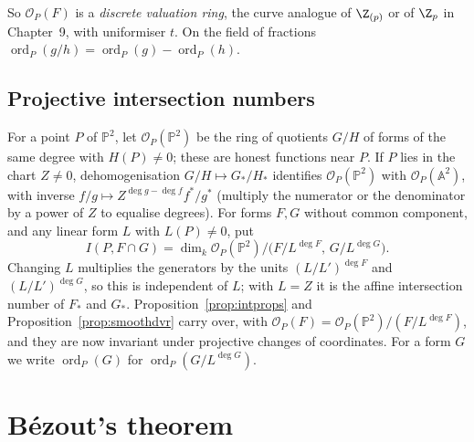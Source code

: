 So $\mathcal O_P(F)$ is a \emph{discrete valuation ring}, the curve analogue of $\Z_{(p)}$ or of $\Z_p$ in Chapter~9, with uniformiser $t$.
On the field of fractions $\operatorname{ord}_P(g/h)=\operatorname{ord}_P(g)-\operatorname{ord}_P(h)$.

\subsection*{Projective intersection numbers}

For a point $P$ of $\mathbb P^2$, let $\mathcal O_P(\mathbb P^2)$ be the ring of quotients $G/H$ of forms of the same degree with $H(P)\ne0$; these are
honest functions near $P$. If $P$ lies in the chart $Z\ne0$, dehomogenisation $G/H\mapsto G_*/H_*$ identifies $\mathcal O_P(\mathbb P^2)$ with
$\mathcal O_P(\mathbb A^2)$, with inverse $f/g\mapsto Z^{\deg g-\deg f}f^*/g^*$ (multiply the numerator or the denominator by a power of $Z$ to equalise
degrees). For forms $F,G$ without common component, and any linear form $L$ with $L(P)\ne0$, put
\[
I(P,F\cap G)=\dim_k\mathcal O_P(\mathbb P^2)\big/\bigl(F/L^{\deg F},\,G/L^{\deg G}\bigr).
\]
Changing $L$ multiplies the generators by the units $(L/L')^{\deg F}$ and $(L/L')^{\deg G}$, so this is independent of $L$; with $L=Z$ it is the
affine intersection number of $F_*$ and $G_*$. Proposition~\ref{prop:intprops} and Proposition~\ref{prop:smoothdvr} carry over, with $\mathcal O_P(F)=\mathcal O_P(\mathbb P^2)/(F/L^{\deg F})$, and they are now invariant under projective changes of coordinates. For a
form $G$ we write $\operatorname{ord}_P(G)$ for $\operatorname{ord}_P(G/L^{\deg G})$.

\section{B\'ezout's theorem}

